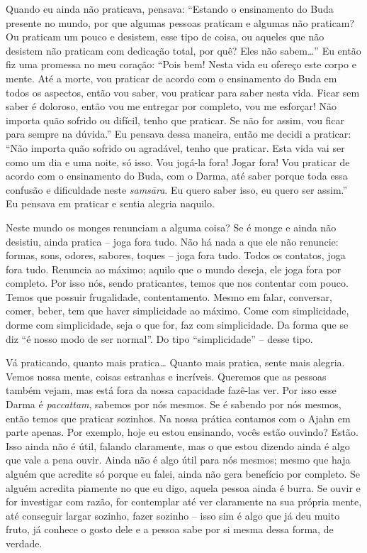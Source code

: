 Quando eu ainda não praticava, pensava: “Estando o ensinamento do
Buda presente no mundo, por que algumas pessoas praticam e algumas não
praticam? Ou praticam um pouco e desistem, esse tipo de coisa, ou
aqueles que não desistem não praticam com dedicação total, por quê?
Eles não sabem…” Eu então fiz uma promessa no meu coração: “Pois bem!
Nesta vida eu ofereço este corpo e mente. Até a morte, vou praticar de
acordo com o ensinamento do Buda em todos os aspectos, então vou saber,
vou praticar para saber nesta vida. Ficar sem saber é doloroso, então
vou me entregar por completo, vou me esforçar! Não importa quão sofrido
ou difícil, tenho que praticar. Se não for assim, vou ficar para sempre
na dúvida.” Eu pensava dessa maneira, então me decidi a praticar: “Não
importa quão sofrido ou agradável, tenho que praticar. Esta vida vai
ser como um dia e uma noite, só isso. Vou jogá-la fora! Jogar fora! Vou
praticar de acordo com o ensinamento do Buda, com o Darma, até saber
porque toda essa confusão e dificuldade neste \textit{sams\=ara}. Eu
quero saber isso, eu quero ser assim.” Eu pensava em praticar e sentia
alegria naquilo. 

Neste mundo os monges renunciam a alguma coisa? Se é monge e ainda
não desistiu, ainda pratica – joga fora tudo. Não há nada a que ele não
renuncie: formas, sons, odores, sabores, toques – joga fora tudo. Todos
os contatos, joga fora tudo. Renuncia ao máximo; aquilo que o mundo
deseja, ele joga fora por completo. Por isso nós, sendo praticantes,
temos que nos contentar com pouco. Temos que possuir frugalidade,
contentamento. Mesmo em falar, conversar, comer, beber, tem que haver
simplicidade ao máximo. Come com simplicidade, dorme com simplicidade,
seja o que for, faz com simplicidade. Da forma que se diz “é nosso modo
de ser normal”. Do tipo “simplicidade” – desse tipo. 

Vá praticando, quanto mais pratica… Quanto mais pratica, sente mais
alegria. Vemos nossa mente, coisas estranhas e incríveis. Queremos que
as pessoas também vejam, mas está fora da nossa capacidade fazê-las
ver. Por isso esse Darma é \textit{paccattam}, sabemos por nós mesmos.
Se é sabendo por nós mesmos, então temos que praticar sozinhos. Na
nossa prática contamos com o Ajahn em parte apenas. Por exemplo, hoje
eu estou ensinando, vocês estão ouvindo? Estão. Isso ainda não é útil,
falando claramente, mas o que estou dizendo ainda é algo que vale a
pena ouvir. Ainda não é algo útil para nós mesmos; mesmo que haja
alguém que acredite só porque eu falei, ainda não gera benefício por
completo. Se alguém acredita piamente no que eu digo, aquela pessoa
ainda é burra. Se ouvir e for investigar com razão, for contemplar até
ver claramente na sua própria mente, até conseguir largar sozinho,
fazer sozinho – isso sim é algo que já deu muito fruto, já conhece o
gosto dele e a pessoa sabe por si mesma dessa forma, de verdade. 


